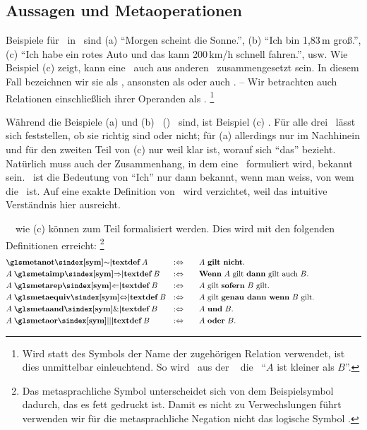 \subsection{Aussagen und Metaoperationen}%
\label{sub:AussagenUndMetaoperationen}

Beispiele für \ in \Metasprache\ sind
(a) \enquote{Morgen scheint die Sonne.},
(b) \enquote{Ich bin 1,83\,m groß.},
(c) \enquote{Ich habe ein rotes Auto und das kann 200\,km/h schnell fahren.}, usw.
Wie Beispiel (c) zeigt, kann eine \Aussage\ auch aus anderen \Aussagen\ zusammengesetzt sein.
In diesem Fall bezeichnen wir sie als , ansonsten als  oder auch .
-- Wir betrachten auch Relationen einschließlich ihrer Operanden als \Aussagen.%
\footnote{%
	Wird statt des Symbols der Name der zugehörigen Relation verwendet, ist dies unmittelbar einleuchtend.
	So wird \textzB\ aus der \Formel\  die \Aussage\ \enquote{$A$ ist kleiner als $B$}.
}

Während die Beispiele (a) und (b) \unzerlegbare\ (\atomare) \Aussagen\ sind, ist Beispiel (c) \zerlegbar.
Für alle drei \Aussagen\ lässt sich feststellen, ob sie richtig sind oder nicht;
für (a) allerdings nur im Nachhinein und für den zweiten Teil von (c) nur weil klar ist, worauf sich \enquote{das} bezieht.
Natürlich muss auch der Zusammenhang, in dem eine \Aussage\ formuliert wird, bekannt sein.
\textZB\ ist die Bedeutung von \enquote{Ich} nur dann bekannt, wenn man weiss, von wem die \Aussage\ ist.
Auf eine exakte Definition von \Aussage\ wird verzichtet, weil das intuitive Verständnis hier ausreicht.

\Zerlegbare\ \Aussagen\ wie (c) können zum Teil formalisiert werden.
Dies wird mit den folgenden Definitionen erreicht:%
\footnote{%
	Das metasprachliche Symbol \chrqt{\symmetanot} unterscheidet sich von dem Beispielsymbol \chrqt{\symrelbsp} dadurch, das es fett gedruckt ist.
	Damit es nicht zu Verwechslungen führt verwenden wir für die metasprachliche Negation nicht das logische Symbol \chrqt{\symlnot}.
}
\begin{align}
	&   \undefinition{\symmetanot}   A & \metadefeq \qquad &
	\text{$A$ \defn{gilt nicht}.}
	\\
	& A \opdefinition{\symmetaimp}   B & \metadefeq \qquad &
	\text{\defn{Wenn} $A$ gilt \defn{dann} gilt auch $B$.}
	\\
	& A \opdefinition{\symmetarep}   B & \metadefeq \qquad &
	\text{$A$ gilt \defn{sofern} $B$ gilt.}
	\\
	& A \opdefinition{\symmetaequiv} B & \metadefeq \qquad &
	\text{$A$ gilt \defn{genau dann wenn} $B$ gilt.}
	\\
	& A \opdefinition{\symmetaand}   B & \metadefeq \qquad &
	\text{$A$ \defn{und}  $B$.}
	\\
	& A \opdefinition{\symmetaor}    B & \metadefeq \qquad &
	\text{$A$ \defn{oder} $B$.}
	\formulatoleft
\end{align}


